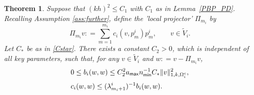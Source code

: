 \documentclass[numbers,webpdf,imaiai]{ima-authoring-template}%
\theoremstyle{thmstyletwo}%
\newtheorem{theorem}{Theorem}[section]
\numberwithin{equation}{section}
\newcommand{\wV}{\widetilde{V}}
\newcommand{\Cstar}{C_{\ast}}
\newcommand{\assign}{\mathrel{\mathop:}=}
\numberwithin{equation}{section}
\newcommand{\amax}{a_{\textup{\textsf{max}}}}
\newcommand{\nmin}{n_{\textup{\textsf{min}}}}
\begin{document}
{\begin{theorem}
\label{Lemma_3_1}
Suppose that $(kh)^2 \le C_1$ with $C_1$ as in Lemma~\ref{PBP_PD}.
Recalling Assumption \ref{ass:further}, define the 'local projector' $\Pi_{m_i}$ by
\begin{equation}
\label{eq:proj}
	\Pi_{m_i} v \assign \sum_{m=1}^{m_i} c_i(v, p^i_m)  p_m^i, \qquad v \in \wV_i. 
\end{equation}
Let $\Cstar$ be as in \eqref{Cstar}.  There exists a constant $C_2>0$, which is independent of all key parameters,
such that, for any $v \in \wV_i$ and $w \assign v-\Pi_{m_i} v$, 
\begin{align}
	& 0 \le b_{i}(w,w) \le C_2^2 \amax \nmin^{-1} \Cstar \Vert v \Vert_{1,k,\Omega_i^c}^2,
	\label{new_1}
	\\[0.5ex]
	& c_{i}(w,w) \le (\lambda_{m_i+1}^i)^{-1} b_{i}(w,w).
	\label{new_2}
\end{align}
\end{theorem}

}
\end{document}
